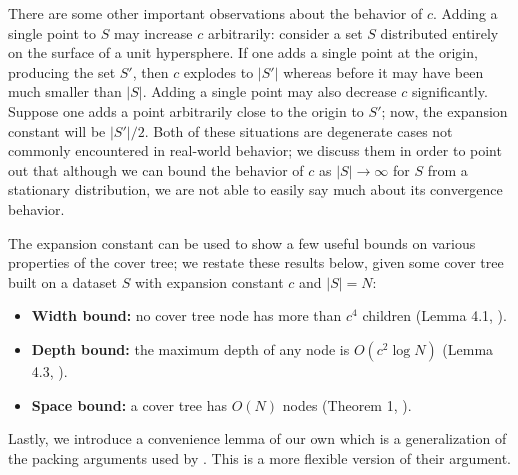 There are some other important observations about the behavior of $c$.  Adding a
single point to $S$ may increase $c$ arbitrarily: consider a set $S$ distributed
entirely on the surface of a unit hypersphere.  If one adds a single point at
the origin, producing the set $S'$, then $c$ explodes to $|S'|$ whereas before
it may have been much smaller than $|S|$.  Adding a single point may also
decrease $c$ significantly.  Suppose one adds a point arbitrarily close to the
origin to $S'$; now, the expansion constant will be $|S'| / 2$.  Both of these
situations are degenerate cases not commonly encountered in real-world behavior;
we discuss them in order to point out that although we can bound the behavior of
$c$ as $|S| \to \infty$ for $S$ from a stationary distribution, we are not able
to easily say much about its convergence behavior.

The expansion constant can be used to show a few useful bounds on various
properties of the cover tree; we restate these results below, given some cover
tree built on a dataset $S$ with expansion constant $c$ and $|S| = N$:

\begin{itemize}
  \item {\bf Width bound:} no cover tree node has more than $c^4$ children
(Lemma 4.1, \cite{langford2006}).

  \item {\bf Depth bound:} the maximum depth of any node is $O(c^2 \log N)$
(Lemma 4.3, \cite{langford2006}).

  \item {\bf Space bound:} a cover tree has $O(N)$ nodes (Theorem 1,
\cite{langford2006}).
\end{itemize}



Lastly, we introduce a convenience lemma of our own which is a generalization of
the packing arguments used by \citet{langford2006}.  This is a more flexible
version of their argument.

